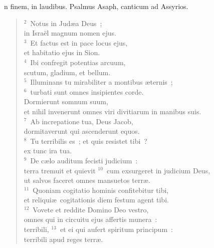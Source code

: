 \bchapter[Psalm]
n finem, in laudibus. Psalmus Asaph, canticum ad Assyrios.
\begin{verse}${}^{2}$~Notus in Jud\ae a Deus~;\\ in Isra\"el magnum nomen ejus.\\
${}^{3}$~Et factus est in pace locus ejus,\\ et habitatio ejus in Sion.\\
${}^{4}$~Ibi confregit potentias arcuum,\\ scutum, gladium, et bellum.\\
${}^{5}$~Illuminans tu mirabiliter a montibus \ae ternis~;\\
${}^{6}$~turbati sunt omnes insipientes corde.\\ Dormierunt somnum suum,\\ et nihil invenerunt omnes viri divitiarum in manibus suis.\\
${}^{7}$~Ab increpatione tua, Deus Jacob,\\ dormitaverunt qui ascenderunt equos.\\
${}^{8}$~Tu terribilis es~; et quis resistet tibi~?\\ ex tunc ira tua.\\
${}^{9}$~De c\ae lo auditum fecisti judicium~:\\ terra tremuit et quievit
${}^{10}$~cum exsurgeret in judicium Deus,\\ ut salvos faceret omnes mansuetos terr\ae .\\
${}^{11}$~Quoniam cogitatio hominis confitebitur tibi,\\ et reliqui\ae\ cogitationis diem festum agent tibi.\\
${}^{12}$~Vovete et reddite Domino Deo vestro,\\ omnes qui in circuitu ejus affertis munera~:\\ terribili,
${}^{13}$~et ei qui aufert spiritum principum~:\\ terribili apud reges terr\ae .\end{verse}




